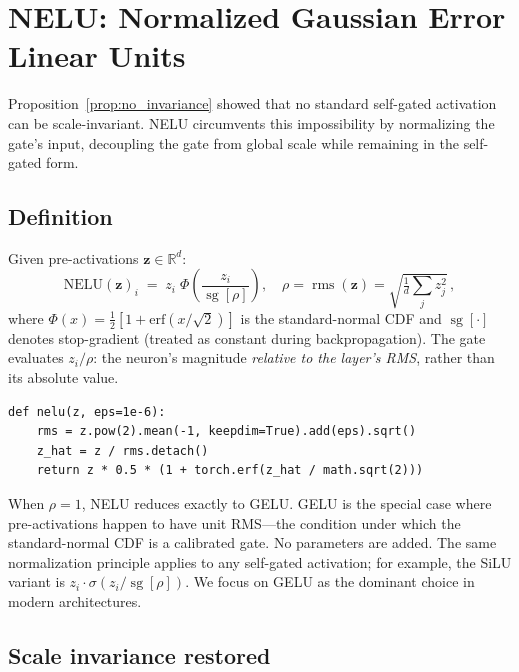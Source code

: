 \section{NELU: Normalized Gaussian Error Linear Units}\label{sec:method}

Proposition~\ref{prop:no_invariance} showed that no standard self-gated activation can be scale-invariant.
NELU circumvents this impossibility by normalizing the gate's input, decoupling the gate from global scale while remaining in the self-gated form.

\subsection{Definition}\label{sec:definition}

Given pre-activations $\mathbf{z} \in \mathbb{R}^d$:
\begin{equation}\label{eq:nelu}
    \mathrm{NELU}(\mathbf{z})_i \;=\; z_i \;\Phi\!\left(\frac{z_i}{\operatorname{sg}[\rho]}\right), \quad
    \rho = \operatorname{rms}(\mathbf{z}) = \sqrt{\tfrac{1}{d}\textstyle\sum_j z_j^2}\,,
\end{equation}
where $\Phi(x) = \tfrac{1}{2}[1 + \mathrm{erf}(x/\sqrt{2})]$ is the standard-normal CDF and $\operatorname{sg}[\cdot]$ denotes stop-gradient (treated as constant during backpropagation).
The gate evaluates $z_i / \rho$: the neuron's magnitude \emph{relative to the layer's RMS}, rather than its absolute value.

\begin{verbatim}
def nelu(z, eps=1e-6):
    rms = z.pow(2).mean(-1, keepdim=True).add(eps).sqrt()
    z_hat = z / rms.detach()
    return z * 0.5 * (1 + torch.erf(z_hat / math.sqrt(2)))
\end{verbatim}

When $\rho = 1$, NELU reduces exactly to GELU.
GELU is the special case where pre-activations happen to have unit RMS---the condition under which the standard-normal CDF is a calibrated gate.
No parameters are added.
The same normalization principle applies to any self-gated activation; for example, the SiLU variant is $z_i \cdot \sigma(z_i / \operatorname{sg}[\rho])$.
We focus on GELU as the dominant choice in modern architectures.

\subsection{Scale invariance restored}\label{sec:scale_inv}

